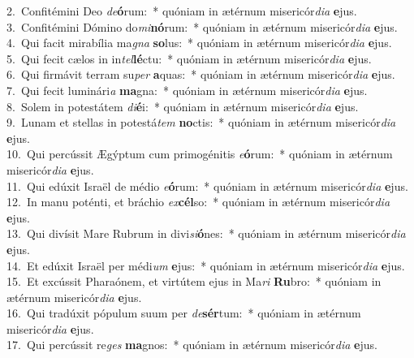 {2.~}Confitémini Deo \textit{de}\textbf{ó}rum:~* quóniam in ætérnum misericór\textit{di}\textit{a} \textbf{e}jus.\\
{3.~}Confitémini Dómino do\textit{mi}\textbf{nó}rum:~* quóniam in ætérnum misericór\textit{di}\textit{a} \textbf{e}jus.\\
{4.~}Qui facit mirabília ma\textit{gna} \textbf{so}lus:~* quóniam in ætérnum misericór\textit{di}\textit{a} \textbf{e}jus.\\
{5.~}Qui fecit cælos in in\textit{tel}\textbf{lé}ctu:~* quóniam in ætérnum misericór\textit{di}\textit{a} \textbf{e}jus.\\
{6.~}Qui firmávit terram su\textit{per} \textbf{a}quas:~* quóniam in ætérnum misericór\textit{di}\textit{a} \textbf{e}jus.\\
{7.~}Qui fecit luminári\textit{a} \textbf{ma}gna:~* quóniam in ætérnum misericór\textit{di}\textit{a} \textbf{e}jus.\\
{8.~}Solem in potestátem \textit{di}\textbf{é}i:~* quóniam in ætérnum misericór\textit{di}\textit{a} \textbf{e}jus.\\
{9.~}Lunam et stellas in potestá\textit{tem} \textbf{no}ctis:~* quóniam in ætérnum misericór\textit{di}\textit{a} \textbf{e}jus.\\
{10.~}Qui percússit Ægýptum cum primogénitis \textit{e}\textbf{ó}rum:~* quóniam in ætérnum misericór\textit{di}\textit{a} \textbf{e}jus.\\
{11.~}Qui edúxit Israël de médio \textit{e}\textbf{ó}rum:~* quóniam in ætérnum misericór\textit{di}\textit{a} \textbf{e}jus.\\
{12.~}In manu poténti, et bráchio \textit{ex}\textbf{cél}so:~* quóniam in ætérnum misericór\textit{di}\textit{a} \textbf{e}jus.\\
{13.~}Qui divísit Mare Rubrum in divi\textit{si}\textbf{ó}nes:~* quóniam in ætérnum misericór\textit{di}\textit{a} \textbf{e}jus.\\
{14.~}Et edúxit Israël per médi\textit{um} \textbf{e}jus:~* quóniam in ætérnum misericór\textit{di}\textit{a} \textbf{e}jus.\\
{15.~}Et excússit Pharaónem, et virtútem ejus in Ma\textit{ri} \textbf{Ru}bro:~* quóniam in ætérnum misericór\textit{di}\textit{a} \textbf{e}jus.\\
{16.~}Qui tradúxit pópulum suum per \textit{de}\textbf{sér}tum:~* quóniam in ætérnum misericór\textit{di}\textit{a} \textbf{e}jus.\\
{17.~}Qui percússit re\textit{ges} \textbf{ma}gnos:~* quóniam in ætérnum misericór\textit{di}\textit{a} \textbf{e}jus.\\
